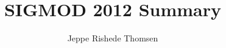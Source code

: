 \documentclass[t,mathserif]{beamer}
\title[SIGMOD 2012\hspace{17em}\insertframenumber/\inserttotalframenumber]{SIGMOD 2012 Summary}
\author[SIGMOD 2012]{Jeppe Rishede Thomsen}%
\begin{document}
\begin{frame}[plain] %
\titlepage
\end{frame}




\end{document}
